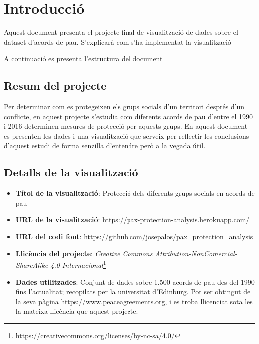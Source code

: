 \documentclass{article}
\title{\large \subject \\ \activity}
\author{Josep Alòs Pascual}
\date{\today}
\begin{document}
\maketitle

\section{Introducció}
Aquest document presenta el projecte final de visualització de dades sobre el
dataset d'acords de pau. S'explicarà com s'ha implementat la visualització

A continuació es presenta l'estructura del document
\tableofcontents

\subsection{Resum del projecte}
Per determinar com es protegeixen els grups socials d’un territori després d’un
conflicte, en aquest projecte s’estudia com diferents acords de pau d’entre el
1990 i 2016 determinen mesures de protecció per aquests grups. En aquest
document es presenten les dades i una visualització que serveix per reflectir
les conclusions d’aquest estudi de forma senzilla d’entendre però a la vegada
útil.

\subsection{Detalls de la visualització}
\begin{itemize}
    \item \textbf{Títol de la visualització}: Protecció dels diferents grups
        socials en acords de pau
    \item \textbf{URL de la visualització}: \url{https://pax-protection-analysis.herokuapp.com/}
    \item \textbf{URL del codi font}: \url{https://github.com/josepalos/pax_protection_analysis}
    \item \textbf{Llicència del projecte}: \textit{Creative Commons Attribution-NonComercial-ShareAlike 4.0
        Internacional}\footnote{\url{https://creativecommons.org/licenses/by-nc-sa/4.0/}}
    \item \textbf{Dades utilitzades}: Conjunt de dades sobre 1.500 acords de pau
        des del 1990 fins l'actualitat; recopilats
        per la universitat d'Edinburg. Pot ser obtingut de la seva pàgina
        \url{https://www.peaceagreements.org}, i es troba llicenciat sota les
        la mateixa llicència que aquest projecte.
\end{itemize}
\end{document}
